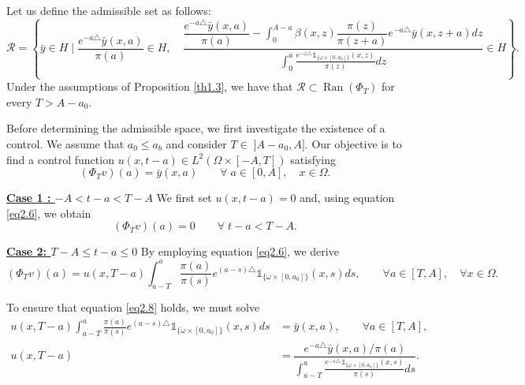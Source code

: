 \documentclass[10pt,a4paper]{amsart}
\makeatletter
\renewenvironment{proof}[1][\proofname]{\par
  \pushQED{\qed}%
  \normalfont \topsep6\p@\@plus6\p@\relax
  \trivlist
  \item[\hskip\labelsep
        \itshape
    #1\ \ref{#1}.]\ignorespaces
}{%
  \popQED\endtrivlist\@endpefalse
}
\makeatother
\begin{document}
\begin{proposition}\label{pr2.3}  
Let us define the admissible set as follows:  
\begin{equation*}
\mathcal{R}=\left\lbrace \bar{y}\in H \mid \dfrac{ e^{-a\triangle}\bar{y}(x,a)}{\pi(a)}\in H ,\quad \dfrac{\dfrac{e^{-a\triangle}\bar{y}(x,a)}{\pi(a) }-\displaystyle\int_{0}^{A-a}\beta(x,z)\dfrac{\pi(z)}{\pi(z+a)}e^{-a\triangle}\bar{y}(x,z+a)dz}{\displaystyle\int_{0}^{a}\frac{e^{-z\triangle}\mathds{1}_{\lbrace\omega\times[0,a_0]\rbrace}(x,z)}{\pi(z) }dz}\in H \right\rbrace.
\end{equation*}  
Under the assumptions of Proposition \ref{th1.3}, we have that \(\mathcal{R}\subset \operatorname{Ran}(\Phi_T)\) for every \(T > A - a_0\).
\end{proposition}

\begin{proof}[of Proposition \ref{pr2.3}]
Before determining the admissible space, we first investigate the existence of a control. We assume that \( a_0 \leq a_b \) and consider \( T \in \;] A-a_0, A] \). Our objective is to find a control function \( u(x,t-a) \in L^2 (\Omega\times [-A,T]) \) satisfying  
\begin{equation}\label{eq2.8}
(\Phi_T v)(a) =\bar{y}(x,a) \qquad \forall \;a\in [0,A],\quad x\in \Omega.
\end{equation}  

{\bf \underline{Case 1 : \( -A < t-a < T-A \)}}
We first set \( u(x,t-a) = 0 \) and, using equation \eqref{eq2.6}, we obtain  
\begin{equation}\label{eq2.9}
(\Phi_T v)(a) = 0 \qquad \forall \;t-a<T-A.
\end{equation}  

{\bf \underline{Case 2: \( T-A \leq t-a \leq 0 \)}}  
By employing equation \eqref{eq2.6}, we derive  
\begin{equation}
(\Phi_T v)(a) = u(x,T-a) \int_{a-T}^{a} \frac{\pi(a)}{\pi(s)} e^{(a-s)\triangle} \mathds{1}_{\lbrace\omega\times[0,a_0]\rbrace}(x,s) ds, \qquad \forall a\in [T,A],\quad \forall x\in \Omega.
\end{equation}  

To ensure that equation \eqref{eq2.8} holds, we must solve  
\begin{align*}
u(x,T-a) \int_{a-T}^{a} \frac{\pi(a)}{\pi(s)} e^{(a-s)\triangle} \mathds{1}_{\lbrace\omega\times[0,a_0]\rbrace}(x,s) ds &= \bar{y}(x,a), \qquad \forall a\in [T,A], \\
u(x,T-a) &= \dfrac{e^{-a\triangle} \bar{y}(x,a) / \pi(a)}{\displaystyle\int_{a-T}^{a} \frac{e^{-s\triangle} \mathds{1}_{\lbrace\omega\times[0,a_0]\rbrace}(x,s)}{\pi(s)} ds}.
\end{align*}  


\end{proof}
\end{document}
